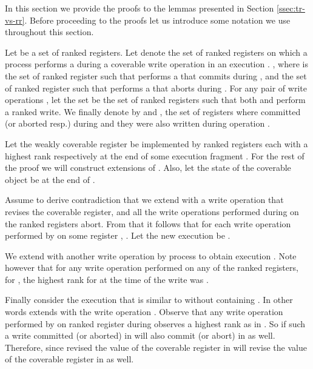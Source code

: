 In this section we provide the proofs to the lemmas presented 
in Section \ref{ssec:tr-vs-rr}. Before proceeding to the proofs 
let us introduce some notation we use throughout this section. 

Let  be a set of ranked registers. Let  denote the set 
of ranked registers on which a process  
performs a  during a coverable write operation 
in an execution . , where  is the set of ranked 
register such that  performs a  that commits 
during , and 
 the set of ranked register such that  performs 
a  that aborts during . 
For any pair of write operations ,
let the set  be the set of ranked registers such that 
both  and  perform a ranked write. We finally denote by
 and , the 
set of registers where  committed (or aborted resp.) during
 and they were also written during operation .\vspace{1em}




Let the weakly coverable register be implemented by  
ranked registers each with a highest rank  
respectively at the end of some execution fragment . 
For the rest of the proof we will construct extensions of .  
Also, let the state of the coverable object be  at the 
end of .

Assume to derive contradiction that we extend  
with a write operation 
that revises the coverable register, and 
all the write operations performed during  on the ranked 
registers abort. From that it follows that for each 
write operation  performed 
by  on some register , . 
Let the new execution be . 


We extend  with another write operation 
 by process  to obtain 
execution . 
Note however that for any write operation  
performed on any of the ranked registers, for ,
the highest rank for  at the time of the write was . 

Finally consider the execution  that is similar to 
 without containing . In other words 
extends  with the write operation . Observe that any 
write operation  performed by  on 
ranked register  during  observes a highest rank  
as in . So if such a write committed (or aborted) in  
will also commit (or abort) in  as well. Therefore,
since  revised the value of the coverable register in  
will revise the value of the coverable register in  
as well. \hfill\vspace{1em}


